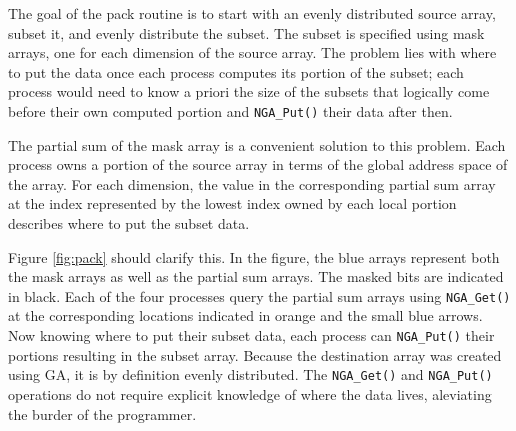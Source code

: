 The goal of the pack routine is to start with an evenly distributed source
array, subset it, and evenly distribute the subset.  The subset is specified
using mask arrays, one for each dimension of the source array.  The problem
lies with where to put the data once each process computes its portion of the
subset; each process would need to know a priori the size of the subsets that
logically come before their own computed portion and \verb=NGA_Put()= their
data after then.

The partial sum of the mask array is a convenient solution to this problem.
Each process owns a portion of the source array in terms of the global address
space of the array.  For each dimension, the value in the corresponding
partial sum array at the index represented by the lowest index owned by each
local portion describes where to put the subset data.

Figure \ref{fig:pack} should clarify this.  In the figure, the blue arrays
represent both the mask arrays as well as the partial sum arrays.  The masked
bits are indicated in black.  Each of the four processes query the partial sum
arrays using \verb=NGA_Get()= at the corresponding locations indicated in
orange and the small blue arrows.  Now knowing where to put their subset data,
each process can \verb=NGA_Put()= their portions resulting in the subset
array.  Because the destination array was created using GA, it is by
definition evenly distributed.  The \verb=NGA_Get()= and \verb=NGA_Put()=
operations do not require explicit knowledge of where the data lives,
aleviating the burder of the programmer.
